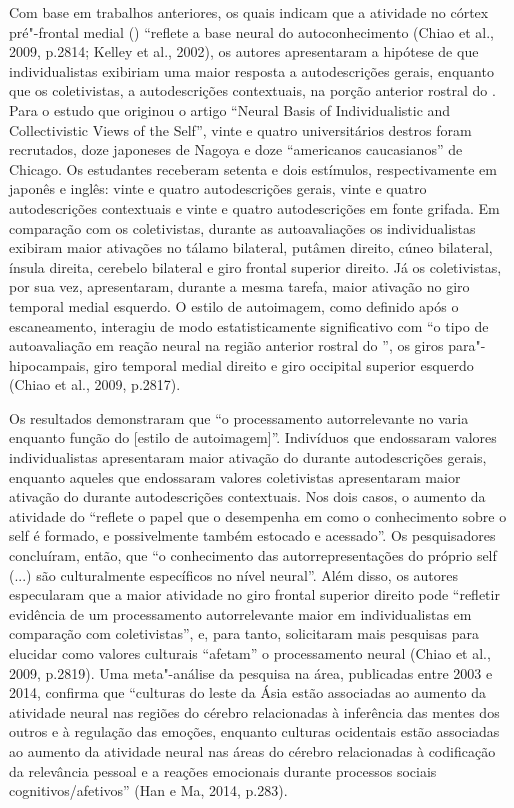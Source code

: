 Com base em trabalhos anteriores, os quais indicam que a atividade no
córtex pré"-frontal medial () ``reflete a base neural do
autoconhecimento (Chiao et al., 2009, p.2814; Kelley et al., 2002), os
autores apresentaram a hipótese de que individualistas exibiriam uma
maior resposta a autodescrições gerais, enquanto que os coletivistas, a
autodescrições contextuais, na porção anterior rostral do . Para o
estudo que originou o artigo ``Neural Basis of Individualistic and
Collectivistic Views of the Self'', vinte e quatro universitários
destros foram recrutados, doze japoneses de Nagoya e doze ``americanos
caucasianos'' de Chicago. Os estudantes receberam setenta e dois
estímulos, respectivamente em japonês e inglês: vinte e quatro
autodescrições gerais, vinte e quatro autodescrições contextuais e vinte
e quatro autodescrições em fonte grifada. Em comparação com os
coletivistas, durante as autoavaliações os individualistas exibiram
maior ativações no tálamo bilateral, putâmen direito, cúneo bilateral,
ínsula direita, cerebelo bilateral e giro frontal superior direito. Já
os coletivistas, por sua vez, apresentaram, durante a mesma tarefa,
maior ativação no giro temporal medial esquerdo. O estilo de
autoimagem, como definido após o escaneamento, interagiu de modo
estatisticamente significativo com ``o tipo de autoavaliação em reação
neural na região anterior rostral do '', os giros para"-hipocampais,
giro temporal medial direito e giro occipital superior esquerdo (Chiao
et al., 2009, p.2817).

Os resultados demonstraram que ``o processamento autorrelevante no 
varia enquanto função do {[}estilo de autoimagem{]}''. Indivíduos que
endossaram valores individualistas apresentaram maior ativação do 
durante autodescrições gerais, enquanto aqueles que endossaram valores
coletivistas apresentaram maior ativação do  durante autodescrições
contextuais. Nos dois casos, o aumento da atividade do  ``reflete o
papel que o  desempenha em como o conhecimento sobre o self é
formado, e possivelmente também estocado e acessado''. Os pesquisadores
concluíram, então, que ``o conhecimento das autorrepresentações do
próprio self (...) são culturalmente específicos no nível neural''. Além
disso, os autores especularam que a maior atividade no giro frontal
superior direito pode ``refletir evidência de um processamento
autorrelevante maior em individualistas em comparação com
coletivistas'', e, para tanto, solicitaram mais pesquisas para elucidar
como valores culturais ``afetam'' o processamento neural (Chiao et al.,
2009, p.2819). Uma meta"-análise da pesquisa na área, publicadas entre
2003 e 2014, confirma que ``culturas do leste da Ásia estão associadas
ao aumento da atividade neural nas regiões do cérebro relacionadas à
inferência das mentes dos outros e à regulação das emoções, enquanto
culturas ocidentais estão associadas ao aumento da atividade neural nas
áreas do cérebro relacionadas à codificação da relevância pessoal e a
reações emocionais durante processos sociais cognitivos/afetivos'' (Han
e Ma, 2014, p.283).

